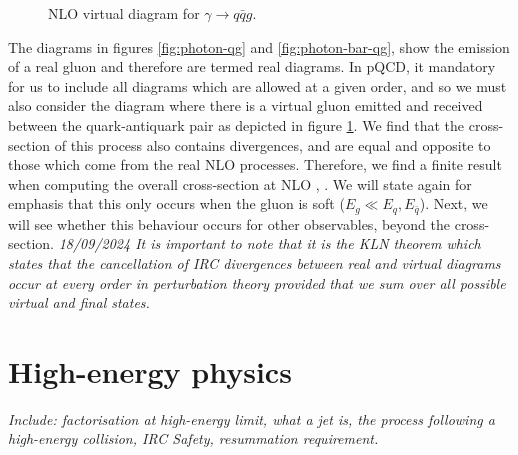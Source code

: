 \begin{figure}[h]
    \centering
    \caption{NLO virtual diagram for $\gamma\rightarrow q\bar{q}g$.}
    \label{fig:photon-qq-gluon}
\end{figure}
The diagrams in figures \ref{fig:photon-qg} and \ref{fig:photon-bar-qg}, show the emission of a real gluon and therefore are termed real diagrams. In pQCD, it mandatory for us to include all diagrams which are allowed at a given order, and so we must also consider the diagram where there is a virtual gluon emitted and received between the quark-antiquark pair as depicted in figure \ref{fig:photon-qq-gluon}. We find that the cross-section of this process also contains divergences, and are equal and opposite to those which come from the real NLO processes. Therefore, we find a finite result when computing the overall cross-section at NLO \cite{Schwartz:2014sze}, \cite{Luisoni:2015xha}. We will state again for emphasis that this only occurs when the gluon is soft ($E_g\ll E_q,E_{\bar{q}}$). Next, we will see whether this behaviour occurs for other observables, beyond the cross-section. \emph{18/09/2024 It is important to note that it is the KLN theorem which states that the cancellation of IRC divergences between real and virtual diagrams occur at every order in perturbation theory provided that we sum over all possible virtual and final states.}



\section{High-energy physics}
\emph{Include: factorisation at high-energy limit, what a jet is, the process following a high-energy collision, IRC Safety, resummation requirement.}

